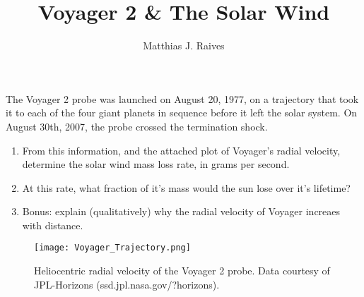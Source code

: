 \documentclass{article}
\title{Voyager 2 \& The Solar Wind}
\author{Matthias J. Raives}
\begin{document}
	
	\maketitle
	
	The Voyager 2 probe was launched on August 20, 1977, on a trajectory that took it to each of the four giant planets in sequence before it left the solar system.  On August 30th, 2007, the probe crossed the termination shock.
	
	\begin{enumerate}
		
	\item From this information, and the attached plot of Voyager's radial velocity, determine the solar wind mass loss rate, in grams per second.
	
	\item At this rate, what fraction of it's mass would the sun lose over it's lifetime?
	
	\item Bonus: explain (qualitatively) why the radial velocity of Voyager increaes with distance.
	
	\end{enumerate}
	
	\begin{figure}[hb]
		\centering{}
		\texttt{[image: Voyager\_Trajectory.png]}
		\caption{Heliocentric radial velocity of the Voyager 2 probe.  Data courtesy of JPL-Horizons (ssd.jpl.nasa.gov/?horizons).}
	\end{figure}
	
\end{document}
